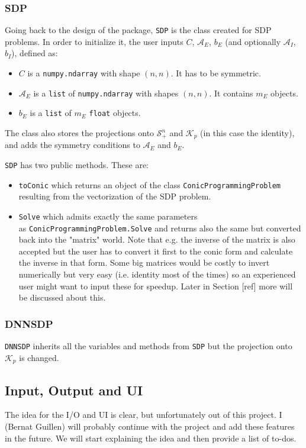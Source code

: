\documentclass[paper=a4, fontsize=11pt]{scrartcl}
\numberwithin{equation}{section}		%
\numberwithin{figure}{section}			%
\numberwithin{table}{section}				%
\begin{document}
\subsubsection{SDP}
Going back to the design of the package, \texttt{SDP} is the class created for SDP problems. In order to initialize it, the user inputs $C$, $\mathcal{A}_E$, $b_E$ (and optionally $\mathcal{A}_I$, $b_I$), defined as:
\begin{itemize}
\item $C$ is a \texttt{numpy.ndarray} with shape $(n,n)$. It has to be symmetric.
\item $\mathcal{A}_E$ is a \texttt{list} of \texttt{numpy.ndarray} with shapes $(n,n)$. It contains $m_E$ objects.
\item $b_E$ is a \texttt{list} of $m_E$ \texttt{float} objects.
\end{itemize}

The class also stores the projections onto $\mathcal{S}^n_+$ and $\mathcal{K}_p$ (in this case the identity), and adds the symmetry conditions to $\mathcal{A}_E$ and $b_E$.

\texttt{SDP} has two public methods. These are:
\begin{itemize}
\item \texttt{toConic} which returns an object of the class \texttt{ConicProgrammingProblem} resulting from the vectorization of the SDP problem.
\item \texttt{Solve} which admits exactly the same parameters\\ as \texttt{ConicProgrammingProblem.Solve} and returns also the same but converted back into the "matrix" world. Note that e.g. the inverse of the matrix is also accepted but the user has to convert it first to the conic form and calculate the inverse in that form. Some big matrices would be costly to invert numerically but very easy (i.e. identity most of the times) so an experienced user might want to input these for speedup. Later in Section [ref] more will be discussed about this.
\end{itemize}
\subsubsection{DNNSDP}
\texttt{DNNSDP} inherits all the variables and methods from \texttt{SDP} but the projection onto $\mathcal{K}_p$ is changed.
\subsection{Input, Output and UI}
The idea for the I/O and UI is clear, but unfortunately out of this project. I (Bernat Guillen) will probably continue with the project and add these features in the future. We will start explaining the idea and then provide a list of to-dos.
\end{document}
